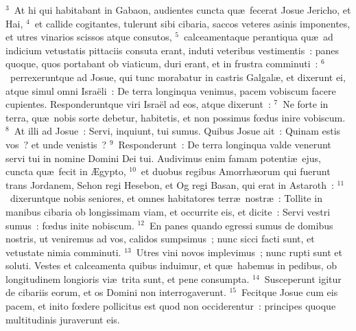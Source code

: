 ${}^{3}$~At hi qui habitabant in Gabaon, audientes cuncta qu\ae\ fecerat Josue Jericho, et Hai,
${}^{4}$~et callide cogitantes, tulerunt sibi cibaria, saccos veteres asinis imponentes, et utres vinarios scissos atque consutos,
${}^{5}$~calceamentaque perantiqua qu\ae\ ad indicium vetustatis pittaciis consuta erant, induti veteribus vestimentis~: panes quoque, quos portabant ob viaticum, duri erant, et in frustra comminuti~:
${}^{6}$~perrexeruntque ad Josue, qui tunc morabatur in castris Galgal\ae , et dixerunt ei, atque simul omni Isra\"eli~: De terra longinqua venimus, pacem vobiscum facere cupientes. Responderuntque viri Isra\"el ad eos, atque dixerunt~:
${}^{7}$~Ne forte in terra, qu\ae\ nobis sorte debetur, habitetis, et non possimus fœdus inire vobiscum.
${}^{8}$~At illi ad Josue~: Servi, inquiunt, tui sumus. Quibus Josue ait~: Quinam estis vos~? et unde venistis~?
${}^{9}$~Responderunt~: De terra longinqua valde venerunt servi tui in nomine Domini Dei tui. Audivimus enim famam potenti\ae\ ejus, cuncta qu\ae\ fecit in \AE gypto,
${}^{10}$~et duobus regibus Amorrh\ae orum qui fuerunt trans Jordanem, Sehon regi Hesebon, et Og regi Basan, qui erat in Astaroth~:
${}^{11}$~dixeruntque nobis seniores, et omnes habitatores terr\ae\ nostr\ae~: Tollite in manibus cibaria ob longissimam viam, et occurrite eis, et dicite~: Servi vestri sumus~: fœdus inite nobiscum.
${}^{12}$~En panes quando egressi sumus de domibus nostris, ut veniremus ad vos, calidos sumpsimus~; nunc sicci facti sunt, et vetustate nimia comminuti.
${}^{13}$~Utres vini novos implevimus~; nunc rupti sunt et soluti. Vestes et calceamenta quibus induimur, et qu\ae\ habemus in pedibus, ob longitudinem longioris vi\ae\ trita sunt, et pene consumpta.
${}^{14}$~Susceperunt igitur de cibariis eorum, et os Domini non interrogaverunt.
${}^{15}$~Fecitque Josue cum eis pacem, et inito fœdere pollicitus est quod non occiderentur~: principes quoque multitudinis juraverunt eis.


